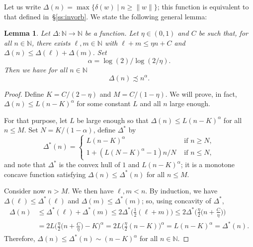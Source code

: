 \documentclass{amsart}
\newcommand\N{\mathbb{N}}
\newtheorem{lemma}{Lemma}[section]
\theoremstyle{definition}
\begin{document}
Let us write $\Delta(n)=\max\{\delta(w)\mid n\ge\|w\|\}$; this
function is equivalent to that defined in~\S\ref{ss:invorb}.
We state the following general lemma:
\begin{lemma}\label{lem:general}
  Let $\Delta:\N\to\N$ be a function. Let $\eta\in(0,1)$ and $C$ be such that, for
  all $n\in\N$, there exists $\ell,m\in\N$ with $\ell+m \le \eta n+C$
  and $\Delta(n) \le \Delta(\ell)+\Delta(m)$.  Set
  \[\alpha=\log(2)/\log(2/\eta).\]
  Then we have for all $n\in\N$
  \[\Delta(n)\precsim n^\alpha.\]
\end{lemma}
\begin{proof}
  Define $K=C/(2-\eta)$ and $M=C/(1-\eta)$. We will prove, in
  fact, $\Delta(n)\le L(n-K)^\alpha$ for some constant $L$ and all $n$
  large enough.

  For that purpose, let $L$ be large enough so that $\Delta(n)\le
  L(n-K)^\alpha$ for all $n\le M$. Set $N=K/(1-\alpha)$, define
  $\Delta^*$ by
  \begin{equation}\label{eq:Delta}
    \Delta^*(n)=\begin{cases} L(n-K)^\alpha & \text{ if }n\ge N,\\
      1+(L(N-K)^\alpha-1)n/N & \text{ if }n\le N,\end{cases}
  \end{equation}
  and note that $\Delta^*$ is the convex hull of $1$ and
  $L(n-K)^\alpha$; it is a monotone concave function satisfying
  $\Delta(n)\le\Delta^*(n)$ for all $n\le M$.
    
  Consider now $n>M$. We then have $\ell,m<n$. By induction, we have
  $\Delta(\ell)\le\Delta^*(\ell)$ and $\Delta(m)\le\Delta^*(m)$; so,
  using concavity of $\Delta^*$,
  \begin{align*}
    \Delta(n) &\le\Delta^*(\ell)+\Delta^*(m)\le 2\Delta^*\Big(\frac12(\ell+m)\Big)\le2\Delta^*\Big(\frac\eta2\big(n+\tfrac C\eta\big)\Big)\\
    &=2L\Big(\frac\eta2\big(n+\tfrac C\eta\big)-K\Big)^\alpha
    =2L\Big(\frac\eta2(n-K)\Big)^\alpha=L(n-K)^\alpha=\Delta^*(n).
  \end{align*}
  Therefore, $\Delta(n)\le\Delta^*(n)\sim(n-K)^\alpha$ for all $n\in\N$.
\end{proof}
\end{document}
